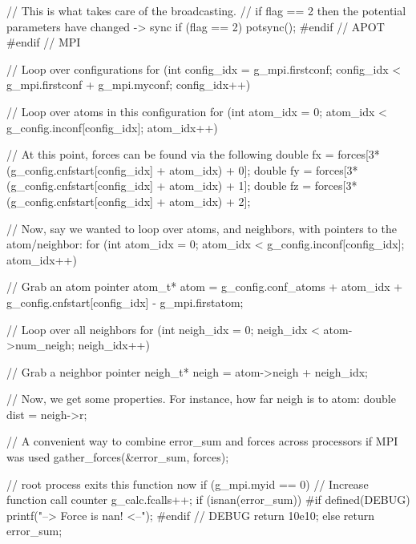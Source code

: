 \documentclass{article}
\begin{document}
\begin{ccode}
{  // This is what takes care of the broadcasting.
  // if flag == 2 then the potential parameters have changed -> sync
  if (flag == 2)
    potsync();
#endif  // APOT
#endif  // MPI






  // Loop over configurations
  for (int config_idx = g_mpi.firstconf; config_idx < g_mpi.firstconf + g_mpi.myconf; config_idx++) {

    // Loop over atoms in this configuration
    for (int atom_idx = 0; atom_idx < g_config.inconf[config_idx]; atom_idx++) {

      // At this point, forces can be found via the following
      double fx = forces[3*(g_config.cnfstart[config_idx] + atom_idx) + 0];
      double fy = forces[3*(g_config.cnfstart[config_idx] + atom_idx) + 1];
      double fz = forces[3*(g_config.cnfstart[config_idx] + atom_idx) + 2];

    }

    // Now, say we wanted to loop over atoms, and neighbors, with pointers to the atom/neighbor:
    for (int atom_idx = 0; atom_idx < g_config.inconf[config_idx]; atom_idx++) {
      // Grab an atom pointer
      atom_t* atom = g_config.conf_atoms + atom_idx + g_config.cnfstart[config_idx] - g_mpi.firstatom;

      // Loop over all neighbors
      for (int neigh_idx = 0; neigh_idx < atom->num_neigh; neigh_idx++) {
        // Grab a neighbor pointer
        neigh_t* neigh = atom->neigh + neigh_idx;

        // Now, we get some properties.  For instance, how far neigh is to atom:
        double dist = neigh->r;
      }

    }

  }






    // A convenient way to combine error_sum and forces across processors if MPI was used
    gather_forces(&error_sum, forces);

    // root process exits this function now
    if (g_mpi.myid == 0) {
      // Increase function call counter
      g_calc.fcalls++;
      if (isnan(error_sum)) {
#if defined(DEBUG)
        printf("\n--> Force is nan! <--\n\n");
#endif  // DEBUG
        return 10e10;
      } else
        return error_sum;
    }


}


\end{ccode}
\end{document}

